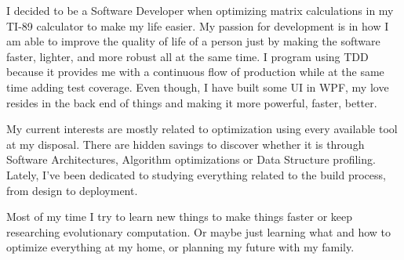 I decided to be a Software Developer when optimizing matrix calculations in my TI-89 calculator to make my life easier. My passion for development is in how I am able to improve the quality of life of a person just by making the software faster, lighter, and more robust all at the same time. I program using TDD because it provides me with a continuous flow of production while at the same time adding test coverage. Even though, I have built some UI in WPF, my love resides in the back end of things and making it more powerful, faster, better. 

My current interests are mostly related to optimization using every available tool at my disposal. There are hidden savings to discover whether it is through Software Architectures, Algorithm optimizations or Data Structure profiling. Lately, I've been dedicated to studying everything related to the build process, from design to deployment.  

Most of my time I try to learn new things to make things faster or keep researching evolutionary computation. Or maybe just learning what and how to optimize everything at my home, or planning my future with my family.